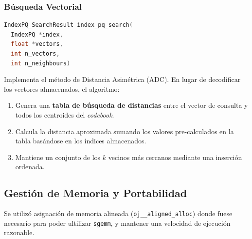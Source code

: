 \subsubsection{B\'usqueda Vectorial}

\begin{lstlisting}[language=C, caption=Busqueda Vectorial]
IndexPQ_SearchResult index_pq_search(
  IndexPQ *index,
  float *vectors,
  int n_vectors,
  int n_neighbours)
\end{lstlisting}

Implementa el m\'etodo de Distancia Asim\'etrica (ADC).
En lugar de decodificar los vectores almacenados, el algoritmo:
\begin{enumerate}
  \item Genera una \textbf{tabla de b\'usqueda de distancias} 
    entre el vector de consulta y todos los centroides del \textit{codebook}.
  \item Calcula la distancia aproximada sumando los valores pre-calculados
    en la tabla bas\'andose en los \'indices almacenados.
  \item Mantiene un conjunto de los $k$ vecinos m\'as cercanos mediante una
    inserci\'on ordenada.
\end{enumerate}

\subsection{Gesti\'on de Memoria y Portabilidad}

Se utiliz\'o asignaci\'on de memoria alineada (\verb|oj__aligned_alloc|) donde 
fuese necesario para poder ultilizar \verb|sgemm|, y mantener una velocidad de
ejecuci\'on razonable.


